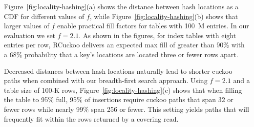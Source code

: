 Figure~\ref{fig:locality-hashing}(a) shows the distance between hash
locations as a CDF for different values of $f$,
while Figure~\ref{fig:locality-hashing}(b) shows that larger values of
$f$ enable practical fill factors for tables with 100~M entries. In
our evaluation we set $f=2.1$.  As shown in the figures, for index
tables with eight entries per row, RCuckoo delivers an expected max fill of
greater than 90\% with a 68\% probability that a key's locations are
located three or fewer rows apart.


Decreased distances between hash locations naturally lead to shorter
cuckoo paths when combined with our breadth-first search approach.
Using $f=2.1$ and a table size of 100-K rows,
Figure~\ref{fig:locality-hashing}(c) shows that when filling the table
to 95\% full, 95\% of insertions require cuckoo paths that span 32 or
fewer rows while nearly 99\% span 256 or fewer.  This setting yields
paths that will frequently fit within the rows returned by a covering
read.  
%



